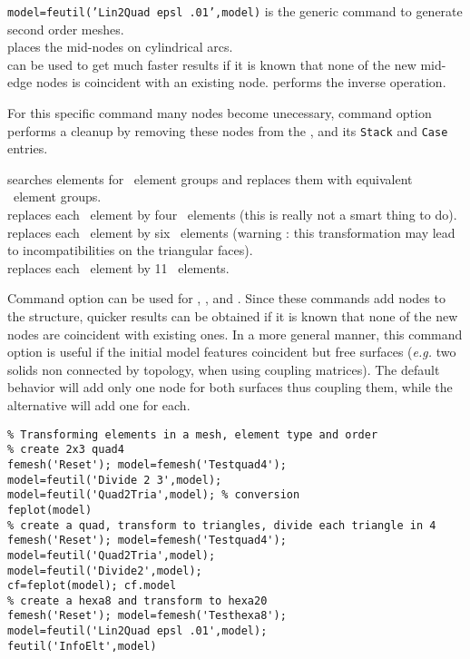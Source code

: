 


{\tt model=feutil('Lin2Quad epsl .01',model)} is the generic command to generate second order meshes.\\
 places the mid-nodes on cylindrical arcs.\\
 can be used to get much faster results if it is known that none of the new mid-edge nodes is coincident with an existing node.
 performs the inverse operation.\\
\begin{SDT}
For this specific command many nodes become unecessary, command option  performs a cleanup by removing these nodes from the , and its {\tt Stack} and {\tt Case} entries.
\end{SDT}
 searches elements for \quada\ element groups and replaces them with equivalent \triaa\ element groups.\\
 replaces each \hexah\ element by four \tetra\ elements (this is really not a smart thing to do).\\
 replaces each \hexah\ element by six \tetra\ elements (warning : this transformation may lead to incompatibilities on the triangular faces).\\
 replaces each \penta\ element by 11 \tetra\ elements. 

Command option  can be used for , , and  . Since these commands add nodes to the structure, quicker results can be obtained if it is known that none of the new nodes are coincident with existing ones. In a more general manner, this command option is useful if the initial model features coincident but free surfaces ({\it e.g.} two solids non connected by topology, when using coupling matrices). The default behavior will add only one node for both surfaces thus coupling them, while the  alternative will add one for each.

\begin{verbatim}
% Transforming elements in a mesh, element type and order
% create 2x3 quad4 
femesh('Reset'); model=femesh('Testquad4'); 
model=feutil('Divide 2 3',model); 
model=feutil('Quad2Tria',model); % conversion
feplot(model)
% create a quad, transform to triangles, divide each triangle in 4
femesh('Reset'); model=femesh('Testquad4');
model=feutil('Quad2Tria',model);
model=feutil('Divide2',model);
cf=feplot(model); cf.model
% create a hexa8 and transform to hexa20
femesh('Reset'); model=femesh('Testhexa8');
model=feutil('Lin2Quad epsl .01',model);
feutil('InfoElt',model)
\end{verbatim}%


